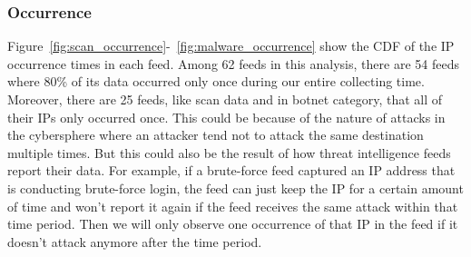
\subsubsection{Occurrence}

Figure~\ref{fig:scan_occurrence}-~\ref{fig:malware_occurrence} show the CDF of the IP occurrence times in each feed. Among 62 feeds in this analysis, there are 54 feeds where 80\% of its data occurred only once during our entire collecting time. Moreover, there are 25 feeds, like {\feedalienvault} scan data and {\feedTSBots} in botnet category, that all of their IPs only occurred once. This could be because of the nature of attacks in the cybersphere where an attacker tend not to attack the same destination multiple times. But this could also be the result of how threat intelligence feeds report their data. For example, if a brute-force feed captured an IP address that is conducting brute-force login, the feed can just keep the IP for a certain amount of time and won't report it again if the feed receives the same attack within that time period. Then we will only observe one occurrence of that IP in the feed if it doesn't attack anymore after the time period.

